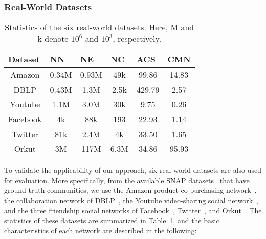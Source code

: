 \documentclass[format=acmsmall, review=false, screen=true]{acmart}
\begin{document}
\subsubsection{Real-World Datasets}\label{sec:5a2}

\begin{table}[t]
\centering
\caption{Statistics of the six real-world datasets. Here, M and k denote $10^6$ and $10^3$, respectively.}
\label{table:2}
\begin{tabular}{|c|c|c|c|c|c|}
\hline
\multicolumn{1}{|l|}{\bf Dataset} & \multicolumn{1}{l|}{\bf NN} & \multicolumn{1}{l|}{\bf NE} & \multicolumn{1}{l|}{\bf NC} & \multicolumn{1}{l|}{\bf ACS} & \multicolumn{1}{l|}{\bf CMN} \\ \hline
Amazon                             & 0.34M                  & 0.93M                  & 49k                   & 99.86                  & 14.83                  \\
DBLP                               & 0.43M                  & 1.3M                   & 2.5k                   & 429.79                 & 2.57    \\  
Youtube                           & 1.1M                & 3.0M                & 30k                 & 9.75                &0.26
\\
Facebook                             & 4k                  & 88k                  & 193                   & 22.93                  & 1.14                  \\
Twitter                               & 81k                  & 2.4M                   & 4k                   & 33.50                 & 1.65 \\  
Orkut                           & 3M                & 117M                & 6.3M                 & 34.86                &95.93
\\ \cline{1-6}            
\end{tabular}
\end{table}
To validate the applicability of our approach, six real-world datasets are also used for evaluation. More specifically, from the available SNAP datasets~\cite{snapdata} that have ground-truth communities, we use the Amazon product co-purchasing network~\cite{amazon}, the collaboration network of DBLP~\cite{dblp}, the Youtube video-sharing social network~\cite{youtube}, and the three friendship social networks of Facebook~\cite{facebook_data}, Twitter~\cite{facebook_data}, and Orkut~\cite{amazon}. The statistics of these datasets are summarized in Table~\ref{table:2}, and the basic characteristics of each network are described in the following:
\end{document}
